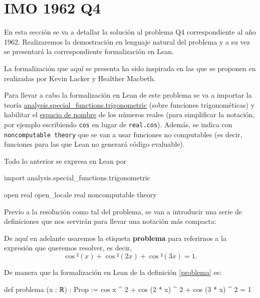 \section{IMO 1962 Q4}

En esta sección se va a detallar la solución al problema Q4
correspondiente al año 1962. Realizaremos la demostración en lenguaje
natural del problema y a su vez se presentará la correspondiente
formalización en Lean.

La formalización que aquí se presenta ha sido inspirada en
las que se proponen en \cite{KLHM} realizadas por Kevin Lacker y
Healther Macbeth.

\noindent
{}

Para llevar a cabo la formalización en Lean de este problema se va a
importar la teoría
\href{https://github.com/leanprover-community/mathlib/blob/master/src/analysis/special_functions/trigonometric.lean}{analysis.special\_functions.trigonometric}
(sobre funciones trigonométicas) y habilitar el
\href{https://leanprover.github.io/reference/other_commands.html#namespaces}{espacio
  de nombre} de los números reales (para simplificar la notación, por
ejemplo escribiendo \texttt{cos} en lugar de \texttt{real.cos}). Además,
se indica con \texttt{noncomputable theory} que se van a usar funciones
no computables (es decir, funciones para las que Lean no generará código
evaluable).

Todo lo anterior se expresa en Lean por
\begin{leancode}
import analysis.special_functions.trigonometric

open real
open_locale real
noncomputable theory
\end{leancode}

Previo a la resolución como tal del problema, se van a introducir
una serie de definiciones que nos servirán para llevar una notación
más compacta:

\begin{definicion}\label{problema}
  De aquí en adelante usaremos la etiqueta \textbf{problema}
  para referirnos a la expresión que queremos resolver,
  es decir,
  \begin{equation}\label{expresionprob}
    \cos²(x)+\cos²(2x)+\cos²(3x)=1.
  \end{equation}
\end{definicion}

De manera que la formalización en Lean de la definición
\ref{problema} es:
\begin{leancode}
def problema (x : ℝ) : Prop :=
cos x ^ 2 + cos (2 * x) ^ 2 + cos (3 * x) ^ 2 = 1
\end{leancode}


